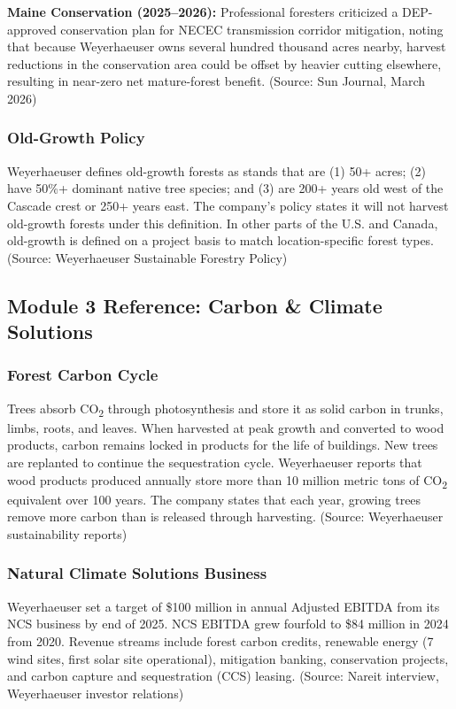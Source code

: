 \documentclass[11pt,letterpaper]{article}
\begin{document}
\textbf{Maine Conservation (2025--2026):} Professional foresters criticized a DEP-approved conservation plan for NECEC transmission corridor mitigation, noting that because Weyerhaeuser owns several hundred thousand acres nearby, harvest reductions in the conservation area could be offset by heavier cutting elsewhere, resulting in near-zero net mature-forest benefit. (Source: Sun Journal, March 2026)

\subsubsection{Old-Growth Policy}

Weyerhaeuser defines old-growth forests as stands that are (1) 50+ acres; (2) have 50\%+ dominant native tree species; and (3) are 200+ years old west of the Cascade crest or 250+ years east. The company's policy states it will not harvest old-growth forests under this definition. In other parts of the U.S. and Canada, old-growth is defined on a project basis to match location-specific forest types. (Source: Weyerhaeuser Sustainable Forestry Policy)

\subsection{Module 3 Reference: Carbon \& Climate Solutions}

\subsubsection{Forest Carbon Cycle}

Trees absorb CO\textsubscript{2} through photosynthesis and store it as solid carbon in trunks, limbs, roots, and leaves. When harvested at peak growth and converted to wood products, carbon remains locked in products for the life of buildings. New trees are replanted to continue the sequestration cycle. Weyerhaeuser reports that wood products produced annually store more than 10 million metric tons of CO\textsubscript{2} equivalent over 100 years. The company states that each year, growing trees remove more carbon than is released through harvesting. (Source: Weyerhaeuser sustainability reports)

\subsubsection{Natural Climate Solutions Business}

Weyerhaeuser set a target of \$100 million in annual Adjusted EBITDA from its NCS business by end of 2025. NCS EBITDA grew fourfold to \$84 million in 2024 from 2020. Revenue streams include forest carbon credits, renewable energy (7 wind sites, first solar site operational), mitigation banking, conservation projects, and carbon capture and sequestration (CCS) leasing. (Source: Nareit interview, Weyerhaeuser investor relations)
\end{document}
